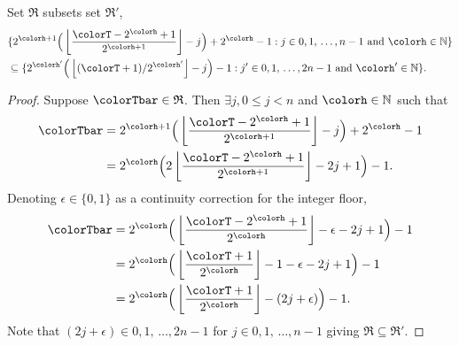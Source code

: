 \begin{sublemma}
\label{thm:tilted-rsubset}
Set $\mathfrak{R}$ subsets set $\mathfrak{R}'$,
\begin{align*}
&\{
  2^{\colorh + 1}\Big( \left\lfloor\frac{\colorT - 2^{\colorh} + 1}{2^{\colorh + 1}} \right\rfloor - j\Big) + 2^{\colorh} - 1
  :
  j \in 0,1,\,\ldots,n-1
  \text{ and }
  \colorh \in \mathbb{N}
\}\\
&\subseteq
\{
  2^{\colorh'}\Big(\left\lfloor (\colorT + 1) / 2^{\colorh'} \right\rfloor - j\Big) - 1
  :
  j' \in 0,1,\,\ldots,2n-1
  \text{ and }
  \colorh' \in \mathbb{N}
\}.
\end{align*}
\end{sublemma}
\begin{proof}
Suppose $\colorTbar \in \mathfrak{R}$.
Then $\exists j,  0 \leq j < n$ and $\colorh \in \mathbb{N}$ such that
\begin{align*}
\colorTbar
&= 2^{\colorh + 1}\Big(\left\lfloor \frac{\colorT - 2^{\colorh} + 1}{2^{\colorh + 1}} \right\rfloor - j \Big) + 2^{\colorh} - 1\\
&= 2^{\colorh} \Big(2\left\lfloor \frac{\colorT - 2^{\colorh} + 1}{2^{\colorh + 1}} \right\rfloor  - 2j + 1 \Big) - 1.
\end{align*}
Denoting $\epsilon \in \{0, 1\}$ as a continuity correction for the integer floor,
\begin{align*}
\colorTbar
&= 2^{\colorh} \Big( \left\lfloor \frac{\colorT - 2^{\colorh} + 1}{2^{\colorh}} \right\rfloor - \epsilon  - 2j + 1 \Big) - 1\\
&= 2^{\colorh} \Big( \left\lfloor \frac{\colorT + 1}{2^{\colorh}} \right\rfloor - 1 - \epsilon - 2j + 1 \Big) - 1\\
&= 2^{\colorh} \Big(\left\lfloor \frac{\colorT + 1}{2^{\colorh}}\right\rfloor - (2j + \epsilon) \Big) - 1.
\end{align*}
Note that $(2j + \epsilon) \in 0,1,\,\ldots,2n-1$ for $j \in 0,1,\,\ldots,n-1$ giving $\mathfrak{R} \subseteq \mathfrak{R}'$.
\end{proof}

